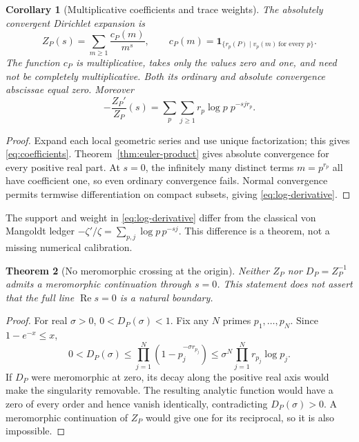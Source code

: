 \documentclass[11pt]{article}
\newtheorem{theorem}{Theorem}[section]
\newtheorem{corollary}[theorem]{Corollary}
\theoremstyle{remark}
\newcommand{\RePart}{\operatorname{Re}}
\begin{document}
\begin{corollary}[Multiplicative coefficients and trace weights]
\label{cor:coefficients}
The absolutely convergent Dirichlet expansion is
\[
 Z_P(s)=\sum_{m\ge1}\frac{c_P(m)}{m^s},
 \qquad
 c_P(m)=
 \mathbf 1_{\{r_p(P)\mid v_p(m)\ \text{for every }p\}}.
 \label{eq:coefficients}
\]
The function \(c_P\) is multiplicative, takes only the values zero and one,
and need not be completely multiplicative.  Both its ordinary and absolute
convergence abscissae equal zero.  Moreover
\[
 -\frac{Z_P'}{Z_P}(s)
 =\sum_p\sum_{j\ge1}
 r_p\log p\;p^{-s j r_p}.
 \label{eq:log-derivative}
\]
\end{corollary}

\begin{proof}
Expand each local geometric series and use unique factorization; this gives
\eqref{eq:coefficients}.  Theorem~\ref{thm:euler-product} gives absolute
convergence for every positive real part.  At \(s=0\), the infinitely many
distinct terms \(m=p^{r_p}\) all have coefficient one, so even ordinary
convergence fails.  Normal convergence permits termwise differentiation on
compact subsets, giving \eqref{eq:log-derivative}.
\end{proof}

The support and weight in \eqref{eq:log-derivative} differ from the classical
von Mangoldt ledger
\(
-\zeta'/\zeta=\sum_{p,j}\log p\,p^{-sj}
\).
This difference is a theorem, not a missing numerical calibration.

\begin{theorem}[No meromorphic crossing at the origin]
\label{thm:origin}
Neither \(Z_P\) nor \(D_P=Z_P^{-1}\) admits a meromorphic continuation through
\(s=0\).  This statement does not assert that the full line
\(\RePart s=0\) is a natural boundary.
\end{theorem}

\begin{proof}
For real \(\sigma>0\), \(0<D_P(\sigma)<1\).  Fix any \(N\) primes
\(p_1,\ldots,p_N\).  Since \(1-e^{-x}\le x\),
\[
 0<D_P(\sigma)
 \le\prod_{j=1}^N(1-p_j^{-\sigma r_{p_j}})
 \le \sigma^N\prod_{j=1}^N r_{p_j}\log p_j.
\]
If \(D_P\) were meromorphic at zero, its decay along the positive real axis
would make the singularity removable.  The resulting analytic function would
have a zero of every order and hence vanish identically, contradicting
\(D_P(\sigma)>0\).  A meromorphic continuation of \(Z_P\) would give one for
its reciprocal, so it is also impossible.
\end{proof}
\end{document}

